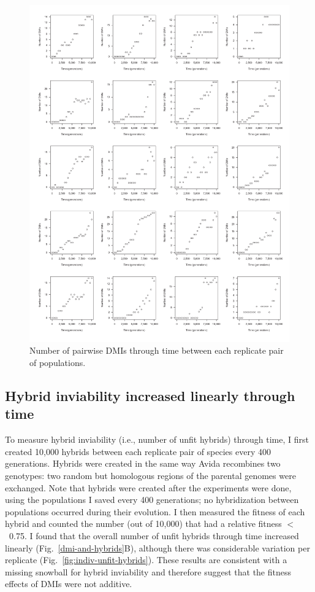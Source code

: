 \begin{doublespace}
\begin{figure}
\begin{center}
\includegraphics[width=0.9\linewidth]{dmi-counts-indiv-plots.pdf}
\end{center}
\caption{Number of pairwise DMIs through time
  between each replicate pair of populations.}
\label{fig:indiv-dmi}
\end{figure}



\subsection{Hybrid inviability increased linearly through time}

To measure hybrid inviability (i.e., number of unfit hybrids) through time,
I first created 10,000 hybrids between each replicate pair of species
every 400 generations.
%
Hybrids were created in the same way Avida recombines two genotypes:
two random but homologous regions of the parental genomes were exchanged.
%
Note that hybrids were created after the experiments were done,
using the populations I saved every 400 generations;
no hybridization between populations occurred during their evolution.
%
I then measured the fitness of each hybrid and counted the number
(out of 10,000) that had a relative fitness $<$~0.75.
%
I found that the overall number of unfit hybrids through time
increased linearly (Fig.~\ref{dmi-and-hybrids}B),
although there was considerable variation per replicate
(Fig.~\ref{fig:indiv-unfit-hybrids}).
%
These results are consistent with a missing snowball for hybrid inviability
and therefore suggest that the fitness effects of DMIs were not additive.




\end{doublespace}
